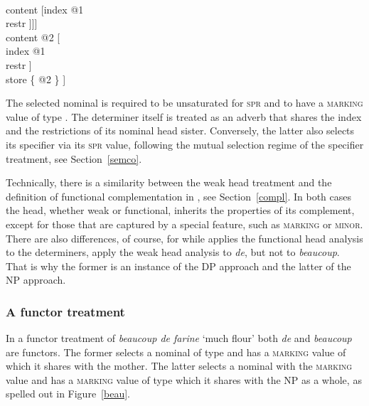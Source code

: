 \documentclass[output=paper
                ,modfonts
                ,nonflat
	        ,collection
	        ,collectionchapter
	        ,collectiontoclongg
 	        ,biblatex
                ,babelshorthands
                ,newtxmath
                ,draftmode
                ,colorlinks, citecolor=brown
]{./langsci/langscibook}
\begin{document}
\begin{exe} 
\ex\label{coup} 
\begin{avm} 
[category|head [\type{adverb}                                 \\
                spec|loc [category [head    & \type{noun}     \\
                                    spr     & <X>             \\
                                    marking & \type{de}]      \\
                          content [index @1                    \\
                                   restr \avmbox{$\Sigma$} ]]] \\ 
 content @2 [         \\
               index @1                  \\
               restr \avmbox{$\Sigma$} ] \\
 store \{ @2 \} ]
\end{avm}
\end{exe} 

\noindent
The selected nominal is required to be unsaturated for \textsc{spr} and to have a 
\textsc{marking} value of type . The determiner itself is treated as an adverb that  
shares the index and the restrictions of its nominal head sister. Conversely, the latter
also selects its specifier via its \textsc{spr} value, following the mutual 
selection regime of the specifier treatment, see Section~\ref{semco}.

Technically, there is a similarity between the weak head treatment and the 
definition of functional complementation in \citet{Netter94}, see Section~\ref{compl}. 
In both cases the head, whether weak or functional, inherits the properties of its 
complement, except for those that are captured by a special feature, such as  
\textsc{marking} or \textsc{minor}. There are also differences, of course, for 
while \citet{Netter94} applies the functional head analysis to the determiners,  
\citet{Abeilleetal04} apply the weak head analysis to \emph{de}, but not to 
\emph{beaucoup}. That is why the former is an instance of the DP approach and the 
latter of the NP approach.  


\subsubsection{A functor treatment} 


In a functor treatment of \emph{beaucoup de farine} `much flour' both \emph{de} and 
\emph{beaucoup} are functors. The former selects a nominal of type  and 
has a \textsc{marking} value of  which it shares with the mother. 
The latter selects a nominal with the \textsc{marking} value 
 and has a \textsc{marking} value of type  which it 
shares with the NP as a whole, as spelled out in Figure~\ref{beau}. 
\end{document}
